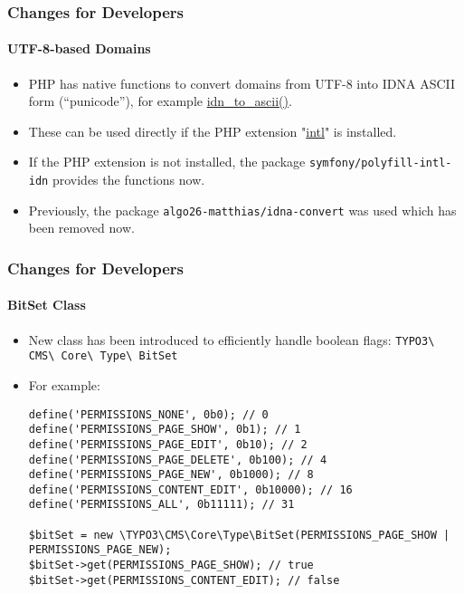 \begin{frame}[fragile]
	\frametitle{Changes for Developers}
	\framesubtitle{UTF-8-based Domains}

	\begin{itemize}
		\item PHP has native functions to convert domains from UTF-8 into IDNA ASCII form (“punicode”),
			for example \href{https://www.php.net/manual/en/function.idn-to-ascii.php}{idn\_to\_ascii()}.

		\item These can be used directly if the PHP extension
			"\href{https://www.php.net/manual/en/book.intl.php}{intl}" is installed.

		\item If the PHP extension is not installed, the package \texttt{symfony/polyfill-intl-idn}
			provides the functions now.

		\item Previously, the package \texttt{algo26-matthias/idna-convert} was used which has been removed now.

	\end{itemize}

\end{frame}


\begin{frame}[fragile]
	\frametitle{Changes for Developers}
	\framesubtitle{BitSet Class}

	\lstset{basicstyle=\tiny\ttfamily}

	\begin{itemize}
		\item New class has been introduced to efficiently handle boolean flags:\newline
			\texttt{TYPO3\textbackslash
				CMS\textbackslash
				Core\textbackslash
				Type\textbackslash
				BitSet}

		\item For example:

\begin{lstlisting}
define('PERMISSIONS_NONE', 0b0); // 0
define('PERMISSIONS_PAGE_SHOW', 0b1); // 1
define('PERMISSIONS_PAGE_EDIT', 0b10); // 2
define('PERMISSIONS_PAGE_DELETE', 0b100); // 4
define('PERMISSIONS_PAGE_NEW', 0b1000); // 8
define('PERMISSIONS_CONTENT_EDIT', 0b10000); // 16
define('PERMISSIONS_ALL', 0b11111); // 31

$bitSet = new \TYPO3\CMS\Core\Type\BitSet(PERMISSIONS_PAGE_SHOW | PERMISSIONS_PAGE_NEW);
$bitSet->get(PERMISSIONS_PAGE_SHOW); // true
$bitSet->get(PERMISSIONS_CONTENT_EDIT); // false
\end{lstlisting}

	\end{itemize}

\end{frame}

